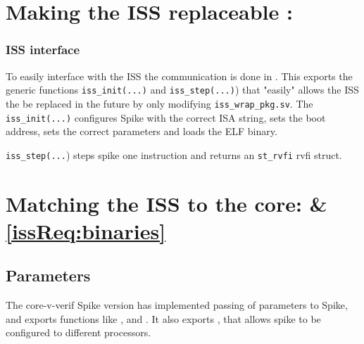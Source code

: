 


\section{Making the ISS replaceable :  }

\subsubsection{ISS interface}

To easily interface with the ISS the communication is done in . This exports the generic functions \lstinline{iss_init(...)} and \lstinline{iss_step(...)}) that "easily" allows the ISS the be replaced in the future by only modifying \lstinline{iss_wrap_pkg.sv}. The \lstinline{iss_init(...)} configures Spike with the correct ISA string, sets the boot address, sets the correct parameters and loads the ELF binary. 

\lstinline{iss_step(...}) steps spike one instruction and returns an \lstinline{st_rvfi} rvfi struct.


\section{Matching the ISS to the core:  \& \ref{issReq:binaries}}

\subsection{Parameters}

The core-v-verif Spike version has implemented passing of parameters to Spike, and exports functions like , and \cite{openhwgroupOpenhwgroupCorevverif2023}. It also exports , that allows spike to be configured to different processors. 

